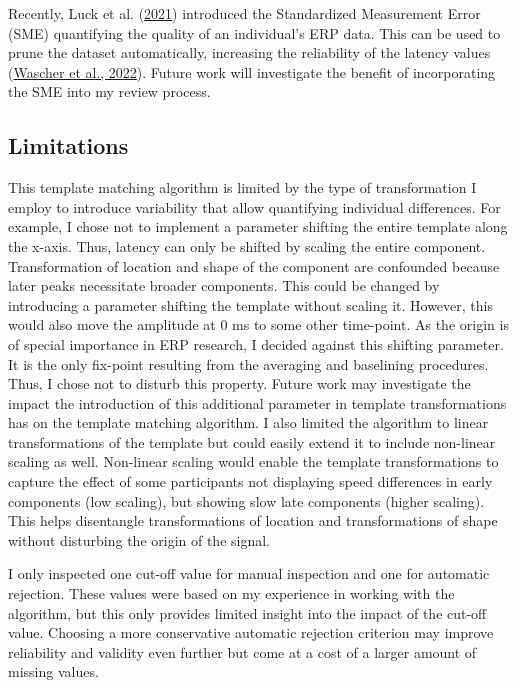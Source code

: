 \documentclass[
  man]{apa7}
\begin{document}
Recently, Luck et al. (\protect\hyperlink{ref-luck2021standardized}{2021}) introduced the Standardized Measurement Error (SME) quantifying the quality of an individual's ERP data. This can be used to prune the dataset automatically, increasing the reliability of the latency values (\protect\hyperlink{ref-wascher2022mental}{Wascher et al., 2022}). Future work will investigate the benefit of incorporating the SME into my review process.

\hypertarget{limitations}{%
\subsection{Limitations}\label{limitations}}

This template matching algorithm is limited by the type of transformation I employ to introduce variability that allow quantifying individual differences. For example, I chose not to implement a parameter shifting the entire template along the x-axis. Thus, latency can only be shifted by scaling the entire component. Transformation of location and shape of the component are confounded because later peaks necessitate broader components. This could be changed by introducing a parameter shifting the template without scaling it. However, this would also move the amplitude at 0 ms to some other time-point. As the origin is of special importance in ERP research, I decided against this shifting parameter. It is the only fix-point resulting from the averaging and baselining procedures. Thus, I chose not to disturb this property. Future work may investigate the impact the introduction of this additional parameter in template transformations has on the template matching algorithm. I also limited the algorithm to linear transformations of the template but could easily extend it to include non-linear scaling as well. Non-linear scaling would enable the template transformations to capture the effect of some participants not displaying speed differences in early components (low scaling), but showing slow late components (higher scaling). This helps disentangle transformations of location and transformations of shape without disturbing the origin of the signal.

I only inspected one cut-off value for manual inspection and one for automatic rejection. These values were based on my experience in working with the algorithm, but this only provides limited insight into the impact of the cut-off value. Choosing a more conservative automatic rejection criterion may improve reliability and validity even further but come at a cost of a larger amount of missing values.
\end{document}
